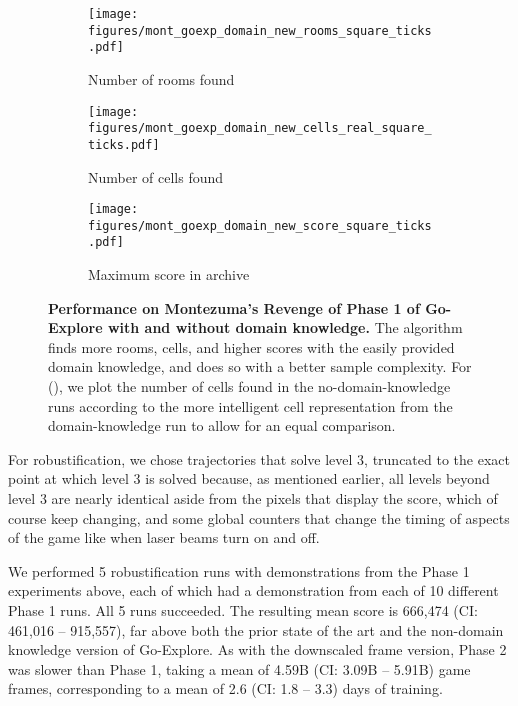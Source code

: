\documentclass{article}
\newcommand{\pivotci}[2]{(CI: #1 -- #2)}  \newcommand{\percci}[2]{}  \newcommand{\tpivotci}[2]{(#1 -- #2)}  \newcommand{\tpercci}[2]{}  \newcommand{\na}[0]{-}
\begin{document}
\begin{figure}
    \begin{subfigure}[t]{.33\textwidth}
        \centering
        \texttt{[image: figures/mont\_goexp\_domain\_new\_rooms\_square\_ticks.pdf]}
        \caption{Number of rooms found}
        \label{fig:mont_domain_room}
    \end{subfigure}
    \begin{subfigure}[t]{.33\textwidth}
        \centering
        \texttt{[image: figures/mont\_goexp\_domain\_new\_cells\_real\_square\_ticks.pdf]}
        \caption{Number of cells found}
        \label{fig:mont_domain_cell}
    \end{subfigure}
    \begin{subfigure}[t]{.33\textwidth}
        \centering
        \texttt{[image: figures/mont\_goexp\_domain\_new\_score\_square\_ticks.pdf]}
        \caption{Maximum score in archive}
        \label{fig:mont_domain_score}
    \end{subfigure}
    \caption{\textbf{Performance on Montezuma's Revenge of Phase 1 of Go-Explore with and without domain knowledge.} The algorithm finds more rooms, cells, and higher scores with the easily provided domain knowledge, and does so with a better sample complexity. For (), we plot the number of cells found in the no-domain-knowledge runs according to the more intelligent cell representation from the domain-knowledge run to allow for an equal comparison.}
    \label{fig:mont_domain_overall}
\end{figure}

For robustification, we chose trajectories that solve level 3, truncated to the exact point at which level 3 is solved because, as mentioned earlier, all levels beyond level 3 are nearly identical aside from the pixels that display the score, which of course keep changing, and some global counters that change the timing of aspects of the game like when laser beams turn on and off. 


We performed 5 robustification runs with demonstrations from the Phase 1 experiments above, each of which had a demonstration from each of 10 different Phase 1 runs. All 5 runs succeeded. The resulting mean score is 666,474 \pivotci{461,016}{915,557}\percci{414,902}{871,933}, far above both the prior state of the art and the non-domain knowledge version of Go-Explore. As with the downscaled frame version, Phase 2 was slower than Phase 1, taking a mean of 4.59B \pivotci{3.09B}{5.91B}\percci{3.26B}{6.05B} game frames, corresponding to a mean of 2.6 \pivotci{1.8}{3.3}\percci{1.9}{3.4} days of training.
\end{document}
